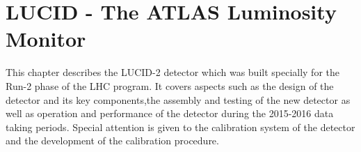 \chapter{LUCID - The ATLAS Luminosity Monitor}
\label{chap:LUCID}

This chapter describes the LUCID-2 detector which was built specially for the Run-2 phase of the LHC program.
It covers aspects such as the design of the detector and its key components,the assembly and testing of the new detector as well as
operation and performance of the detector during the 2015-2016 data taking periods.
Special attention is given to the calibration system of the detector and the development of the calibration procedure.

% 
% 
% 
% 

